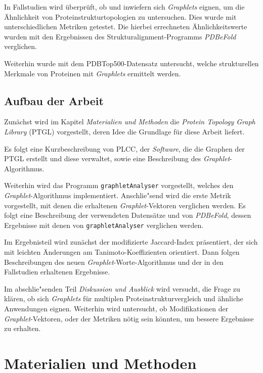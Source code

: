 \documentclass{report}
\begin{document}
In Fallstudien wird \"uberpr\"uft, ob und inwiefern sich \textit{Graphlets} eignen, um die \"Ahnlichkeit von Proteinstrukturtopologien zu untersuchen. Dies wurde mit unterschiedlichen Metriken getestet. Die hierbei errechneten \"Ahnlichkeitswerte wurden mit den Ergebnissen des Strukturalignment-Programms \textit{PDBeFold} \cite{pdbefold} verglichen.

Weiterhin wurde mit dem PDBTop500-Datensatz \cite{top500} untersucht, welche strukturellen Merkmale von Proteinen mit \textit{Graphlets} ermittelt werden.

\section{Aufbau der Arbeit}

Zun\"achst wird im Kapitel \emph{Materialien und Methoden} die \textit{Protein Topology Graph Library} (PTGL) \cite{ptgl1} vorgestellt, deren Idee die Grundlage f\"ur diese Arbeit liefert. 
 
Es folgt eine Kurzbeschreibung von PLCC, der \textit{Software}, die die Graphen der PTGL erstellt und diese verwaltet, sowie eine Beschreibung des \textit{Graphlet}-Algorithmus.

Weiterhin wird das Programm \texttt{graphletAnalyser} vorgestellt, welches den \textit{Graphlet}-Algorithmus implementiert.
Anschlie"send wird die erste Metrik vorgestellt, mit denen die erhaltenen \textit{Graphlet}-Vektoren verglichen werden. Es folgt eine Beschreibung der verwendeten Datens\"atze und von \textit{PDBeFold}, dessen Ergebnisse mit denen von \texttt{graphletAnalyser} verglichen werden.

Im Ergebnisteil wird zun\"achst der modifizierte Jaccard-Index pr\"asentiert, der sich mit leichten \"Anderungen am Tanimoto-Koeffizienten orientiert. Dann folgen Beschreibungen des neuen \textit{Graphlet}-Worte-Algorithmus und der in den Fallstudien erhaltenen Ergebnisse.

Im abschlie"senden Teil \emph{Diskussion und Ausblick} wird versucht, die Frage zu kl\"aren, ob sich \textit{Graphlets} f\"ur multiplen Proteinstrukturvergleich und \"ahnliche Anwendungen eignen. Weiterhin wird untersucht, ob Modifikationen der \textit{Graphlet}-Vektoren, oder der Metriken n\"otig sein k\"onnten, um bessere Ergebnisse zu erhalten. 



\chapter{Materialien und Methoden}
\end{document}
